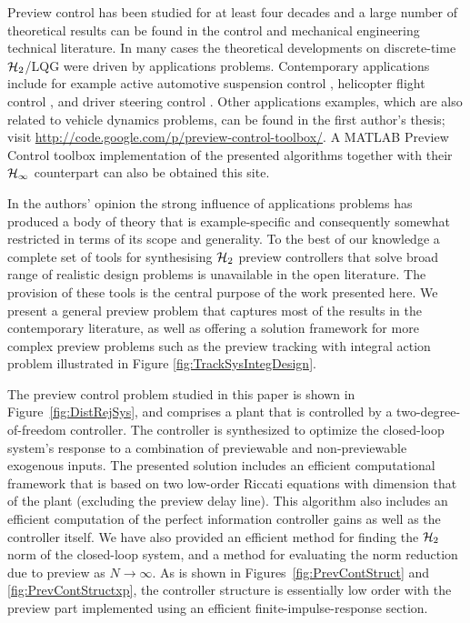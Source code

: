 \label{sec:Conclusions}
Preview control has been studied for at least four decades and a large number of theoretical results can be found in the control and mechanical engineering technical literature. In many cases the theoretical developments on discrete-time $\mathcal H_2$/LQG were driven by applications problems. Contemporary applications include for example active automotive suspension control \cite{Roh_1999_Stoc_Opt_Prev,Marzbanrad_2004_SuspPrev}, helicopter flight control \cite{Paulino_2006_PreviewRotorcraftAffine}, 
and driver steering control \cite{Cole_2006_PredictiveAndPreviewSteeringControl}.
Other applications examples, which are also related to vehicle dynamics problems, can be found in the first author's thesis; visit \url{http://code.google.com/p/preview-control-toolbox/}. A MATLAB Preview Control toolbox implementation of the presented algorithms together with their $\mathcal H_\infty$ counterpart can also be obtained this site.

In the authors' opinion the strong influence of applications problems has produced a body of theory that is example-specific and consequently somewhat restricted in terms of its scope and generality. To the best of our knowledge a complete set of tools for synthesising $\mathcal H_2$ preview controllers that solve broad range of realistic design problems is unavailable in the open literature. The provision of these tools is the central purpose of the work presented here. We present a general preview problem that captures most of the results in the contemporary literature, as well as offering a solution framework for more complex preview problems such as the preview tracking with integral action problem illustrated in Figure \ref{fig:TrackSysIntegDesign}.

The preview control problem studied in this paper is shown in Figure~\ref{fig:DistRejSys}, and  comprises a plant that is controlled by a two-degree-of-freedom controller. The controller is synthesized to optimize the closed-loop system's response to a combination of previewable and non-previewable exogenous inputs.  The presented solution includes an efficient computational framework that is based on two low-order Riccati equations with dimension that of the plant (excluding the preview delay line). This algorithm also includes an efficient computation of the perfect information controller gains as well as the controller itself. We have also provided an efficient method for finding the $\mathcal H_2$ norm of the closed-loop system, and a method for evaluating the norm reduction due to preview as $N \rightarrow \infty$. As is shown in Figures~\ref{fig:PrevContStruct} and \ref{fig:PrevContStructxp}, the controller structure is essentially low order with the preview part implemented using an efficient finite-impulse-response section. 

